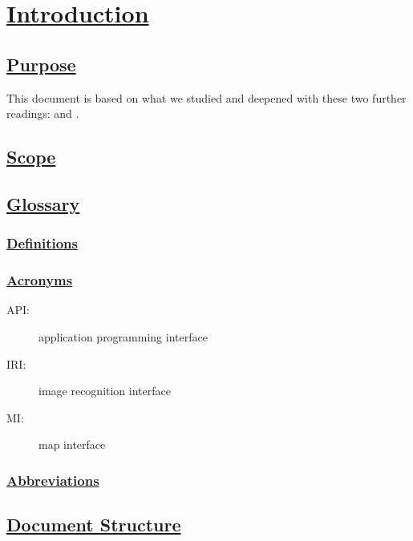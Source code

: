 \section[Introduction]{\hyperlink{toc}{Introduction}}
\subsection[Purpose]{\hyperlink{toc}{Purpose}}
This document is based on what we studied and deepened with these two further readings: \cite{IEEErasd} and \cite{IEEEre}.

\subsection[Scope]{\hyperlink{toc}{Scope}}

\subsection[Glossary]{\hyperlink{toc}{Glossary}}
	\subsubsection[Definitions]{\hyperlink{toc}{Definitions}}
	\subsubsection[Acronyms]{\hyperlink{toc}{Acronyms}}
		\begin{description}
			\item[API:] application programming interface
			\item[IRI:] image recognition interface
			\item[MI:] map interface
		\end{description}
	\subsubsection[Abbreviations]{\hyperlink{toc}{Abbreviations}}
	
		
\subsection[Document Structure]{\hyperlink{toc}{Document Structure}}	

